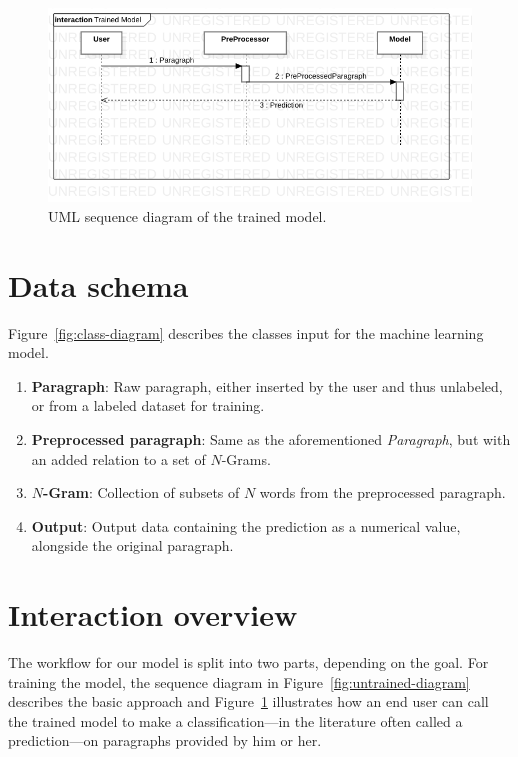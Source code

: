 \documentclass[a4paper]{article}
\begin{document}
\begin{figure}
    \includegraphics[width=1\textwidth]{figures/png/Collaboration1!Interaction1!TrainedModel_1.png}
    \caption{UML sequence diagram of the trained model.}
    \label{fig:trained-diagram}
\end{figure}

\section{Data schema}
Figure~\ref{fig:class-diagram} describes the classes input for the machine learning model. 

\begin{enumerate}
    \item \textbf{Paragraph}: Raw paragraph, either inserted by the user and thus unlabeled, or from a labeled dataset for training.
    \item \textbf{Preprocessed paragraph}: Same as the aforementioned \emph{Paragraph}, but with an added relation to a set of $N$-Grams. 
    \item \textbf{$N$-Gram}: Collection of subsets of $N$ words from the preprocessed paragraph. 
    \item \textbf{Output}: Output data containing the prediction as a numerical value, alongside the original paragraph.
\end{enumerate}

\section{Interaction overview}
The workflow for our model is split into two parts, depending on the goal. For training the model, the sequence diagram in Figure~\ref{fig:untrained-diagram} describes the basic approach and Figure~\ref{fig:trained-diagram} illustrates how an end user can call the trained model to make a classification---in the literature often called a prediction---on paragraphs provided by him or her. 




\end{document}

